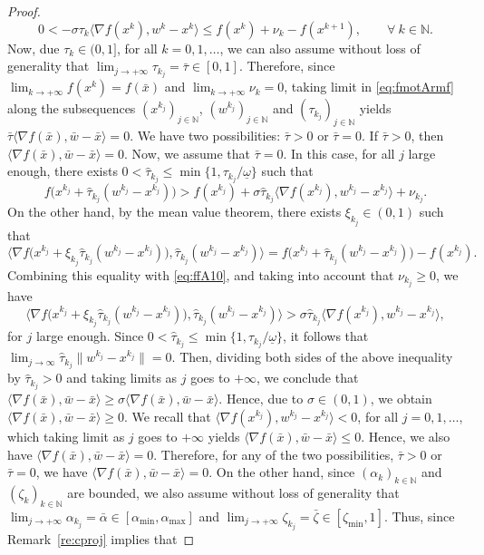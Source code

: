\begin{proof}
	\begin{equation}\label{eq:fmotArmf}
		0 < -\sigma\tau_{k} \big\langle \nabla f(x^{k}), w^{k}-x^{k} \big\rangle \leq f(x^{k}) +\nu_k- f(x^{k+1}), \qquad \forall ~k \in \mathbb{N}.
	\end{equation}
	Now, due $\tau_k \in (0,1]$, for all $k=0,1, \ldots$, we can also assume without loss of generality that $\lim_{j \to +\infty} \tau_{k_j} = \bar{\tau} \in [0,1].$
	Therefore,   since $\lim_{k\to +\infty} f(x^{k}) =f(\bar{x})$ and $\lim_{k\to +\infty} \nu_{k} = 0$, taking limit in \eqref{eq:fmotArmf} along the  subsequences  $(x^{k_j})_{j\in\mathbb{N}}$,  $(w^{k_j})_{j\in\mathbb{N}}$ and $(\tau_{k_j})_{j\in\mathbb{N}}$  yields
	$
		\bar{\tau} \big\langle \nabla f(\bar{x}), \bar{w}- \bar{x} \big\rangle=0.
	$
	We have two possibilities: $\bar{\tau} > 0$ or $\bar{\tau} = 0$. If $\bar{\tau} > 0$, then  $\big\langle \nabla f(\bar{x}), \bar{w}- \bar{x} \big\rangle = 0.$
	Now, we  assume that $\bar{\tau} = 0$. In this case, for all $j$ large enough, there exists $0<\hat\tau_{k_j}\leq \min\{1,\tau_{k_j}/\underline\omega\}$ such that
	\begin{equation}\label{eq:ffA10}
		f\big(x^{k_j}+\hat\tau_{k_j} (w^{k_j} - x^{k_j})\big) > f(x^{k_j}) + \sigma \hat\tau_{k_j} \big\langle \nabla f(x^{k_j}), w^{k_j} - x^{k_j} \big\rangle +\nu_{k_j}.
	\end{equation}
	On the other hand, by the mean value theorem, there exists $\xi_{k_j}\in(0,1)$ such that
	$$\langle \nabla f\big(x^{k_j}+\xi_{k_j}\hat\tau_{k_j} (w^{k_j} - x^{k_j})\big), \hat\tau_{k_j} (w^{k_j} - x^{k_j})\rangle = f\big(x^{k_j}+\hat\tau_{k_j} (w^{k_j} - x^{k_j})\big) - f(x^{k_j}).$$
	Combining this equality with \eqref{eq:ffA10}, and taking into account that $\nu_{k_j}\geq 0$, we have
	$$\langle \nabla f\big(x^{k_j}+\xi_{k_j}\hat\tau_{k_j} (w^{k_j} - x^{k_j})\big), \hat\tau_{k_j} (w^{k_j} - x^{k_j})\rangle>\sigma \hat\tau_{k_j} \big\langle \nabla f(x^{k_j}), w^{k_j} - x^{k_j} \big\rangle,$$
	for $j$ large enough. Since $0<\hat\tau_{k_j}\leq \min\{1,\tau_{k_j}/\underline\omega\}$, it follows that $\lim_{j\to\infty} \hat\tau_{k_j} \|w^{k_j} - x^{k_j}\|=0$. Then, dividing both sides of the above inequality by $\hat\tau_{k_j}>0$ and taking limits as $j$ goes to $+\infty$, we conclude that $ \langle \nabla f(\bar{x}), \bar{w}-\bar{x} \rangle \geq \sigma \langle \nabla f(\bar{x}), \bar{w}-\bar{x} \rangle$.   Hence, due to $\sigma \in (0, 1)$, we obtain $\langle \nabla f(\bar{x}), \bar{w}-\bar{x} \rangle \geq 0$. We recall that $\langle \nabla f(x^{k_j}), w^{k_j}- x^{k_j} \rangle < 0$, for all $j=0, 1, \ldots$, which taking limit as $j$ goes to $+\infty$ yields $\langle \nabla f(\bar{x}), \bar{w}-\bar{x} \rangle \leq 0$. Hence, we also have $\langle \nabla f(\bar{x}), \bar{w}-\bar{x} \rangle = 0$. Therefore, for any of the two possibilities, $\bar{\tau} > 0$ or $\bar{\tau} = 0$, we have $\langle \nabla f(\bar{x}), \bar{w}-\bar{x} \rangle = 0$. On the other hand,  since  $(\alpha_k)_{k\in\mathbb{N}}$ and    $(\zeta_k)_{k\in\mathbb{N}}$   are  bounded, we also assume without loss of generality that $\lim_{j \to +\infty} \alpha_{k_j} = \bar{\alpha} \in [\alpha_{\min}, \alpha_{\max}]$ and $\lim_{j \to +\infty} \zeta_{k_j} = {\bar \zeta} \in [\zeta_{\min}, 1]$. Thus, since Remark~\ref{re:cproj} implies that

\end{proof}
